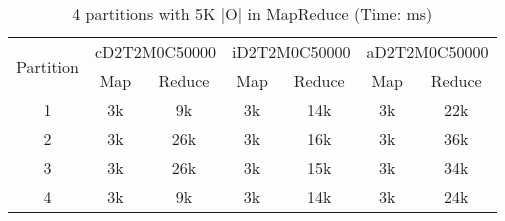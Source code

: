 \begin{table*}[t]
  \centering
\makeatletter
    \long{}
\makeatother
  \caption{4 partitions with 5K |O| in MapReduce (Time: ms)}
    \vspace*{3pt}
  \footnotesize

  \label{table:partition6}
  \begin{tabular}{|c||c|c|c|c|c|c|}
  \hline
  \multirow{2}{*}{Partition} &  \multicolumn{2}{|c|}{cD2T2M0C50000} & \multicolumn{2}{|c|}{iD2T2M0C50000} &\multicolumn{2}{|c|}{aD2T2M0C50000} \\\cline{2-7}
    &  Map & Reduce & Map & Reduce & Map & Reduce \\\hline\hline

\cline{2-7}
    1 &  3k & 9k & 3k & 14k & 3k & 22k \\\hline

\cline{2-7}
    2 &  3k & 26k & 3k & 16k & 3k & 36k \\\hline

\cline{2-7}
    3 &  3k & 26k & 3k & 15k & 3k & 34k  \\\hline
    
\cline{2-7}
    4 &  3k & 9k & 3k & 14k & 3k & 24k  \\\hline

  \end{tabular}
  \vspace*{-17pt}
\end{table*}




